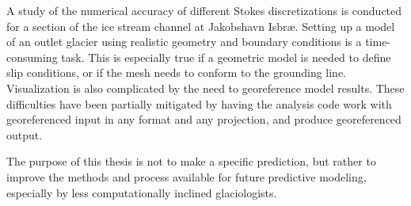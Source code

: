 A study of the numerical accuracy of different Stokes discretizations is conducted for a section of the ice stream channel at Jakobshavn Isbr{\ae}.
Setting up a model of an outlet glacier using realistic geometry and boundary conditions is a time-consuming task.
This is especially true if a geometric model is needed to define slip conditions, or if the mesh needs to conform to the grounding line.
Visualization is also complicated by the need to georeference model results.
These difficulties have been partially mitigated by having the analysis code work with georeferenced input in any format and any projection, and produce georeferenced output.

The purpose of this thesis is not to make a specific prediction, but rather to improve the methods and process available for future predictive modeling, especially by less computationally inclined glaciologists.
